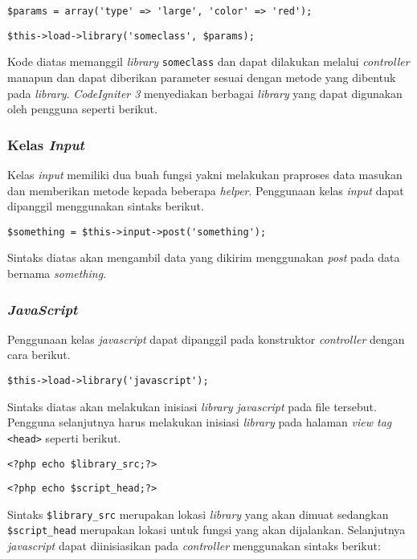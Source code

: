 \begin{center}
\verb|$params = array('type' => 'large', 'color' => 'red');|

\verb|$this->load->library('someclass', $params);|
\end{center} 

Kode diatas memanggil \textit{library} \texttt{someclass} dan dapat dilakukan melalui \textit{controller} manapun dan dapat diberikan parameter sesuai dengan metode yang dibentuk pada \textit{library}. \textit{CodeIgniter 3} menyediakan berbagai \textit{library} yang dapat digunakan oleh pengguna seperti berikut.

\subsubsection{Kelas \textit{Input}}
Kelas \textit{input} memiliki dua buah fungsi yakni melakukan praproses data masukan dan memberikan metode kepada beberapa \textit{helper}. Penggunaan kelas \textit{input} dapat dipanggil menggunakan sintaks berikut.
\begin{center}
	\verb|$something = $this->input->post('something');|
\end{center}
Sintaks diatas akan mengambil data yang dikirim menggunakan \textit{post} pada data bernama \textit{something}.

\subsubsection{\textit{JavaScript}}
Penggunaan kelas \textit{javascript} dapat dipanggil pada konstruktor \textit{controller} dengan cara berikut.

\begin{center}
\verb|$this->load->library('javascript');|
\end{center}

Sintaks diatas akan melakukan inisiasi \textit{library javascript} pada file tersebut. Pengguna selanjutnya harus melakukan inisiasi \textit{library} pada halaman \textit{view tag} \verb|<head>| seperti berikut.

\begin{center}
\verb|<?php echo $library_src;?>|

\verb|<?php echo $script_head;?>|
\end{center}

Sintaks \verb|$library_src| merupakan lokasi \textit{library} yang akan dimuat sedangkan \verb|$script_head| merupakan lokasi untuk fungsi yang akan dijalankan. Selanjutnya \textit{javascript} dapat diinisiasikan pada \textit{controller} menggunakan sintaks berikut:

